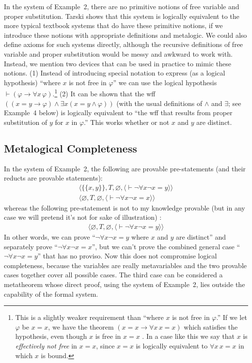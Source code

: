 In the system of Example~2, there are no primitive notions of free variable
and proper substitution.  Tarski \cite{Tarski1965} shows that this system is
logically equivalent to the more typical textbook systems that do have these
primitive notions, if we introduce these notions with appropriate definitions
and metalogic.  We could also define axioms for such systems directly,
although the recursive definitions of free variable and proper substitution
would be messy and awkward to work with.  Instead, we mention two devices that
can be used in practice to mimic these notions.  (1) Instead of introducing
special notation to express (as a logical hypothesis) ``where $x$ is not free
in $\varphi$'' we can use the logical hypothesis $\vdash(\varphi\to\forall
x\,\varphi)$.\label{effectivelybound}\footnote{This is a slightly weaker requirement than ``where $x$ is
not free in $\varphi$.''  If we let $\varphi$ be $x=x$, we have the theorem
$(x=x\to\forall x\,x=x)$ which satisfies the hypothesis, even though $x$ is
free in $x=x$ .  In a case like this we say that $x$ is {\em effectively not
free} in $x=x$, since $x=x$ is logically
equivalent to $\forall x\,x=x$ in which $x$ is bound.} (2) It can be shown
that the wff $((x=y\to\varphi)\wedge\exists x(x=y\wedge\varphi))$ (with the
usual definitions of $\wedge$ and $\exists$; see Example~4 below) is logically
equivalent to ``the wff that results from proper substitution of $y$ for $x$
in $\varphi$.''  This works whether or not $x$ and $y$ are distinct.

\subsection{Metalogical Completeness}

In the system of Example~2, the
following are provable pre-statements (and their reducts are
provable statements):
\begin{eqnarray*}
      & \langle\{\{x,y\}\},T,\varnothing,
               \langle \vdash\lnot\forall x\lnot x=y
               \rangle\rangle & \\
     &  \langle\varnothing,T,\varnothing,
               \langle \vdash\lnot\forall x\lnot x=x
               \rangle\rangle &
\end{eqnarray*}
whereas the following pre-statement is not to my knowledge provable (but
in any case we will pretend it's not for sake of illustration) :
\begin{eqnarray*}
     &  \langle\varnothing,T,\varnothing,
               \langle \vdash\lnot\forall x\lnot x=y
               \rangle\rangle &
\end{eqnarray*}
In other words, we can prove ``$\lnot\forall x\lnot x=y$ where $x$ and $y$ are
distinct'' and separately prove ``$\lnot\forall x\lnot x=x$'', but we can't
prove the combined general case ``$\lnot\forall x\lnot x=y$'' that has no
proviso.  Now this does not compromise logical completeness, because the
variables are really metavariables and the two provable cases together cover
all possible cases.  The third case can be considered a metatheorem whose
direct proof, using the system of Example~2, lies outside the capability of the
formal system.

